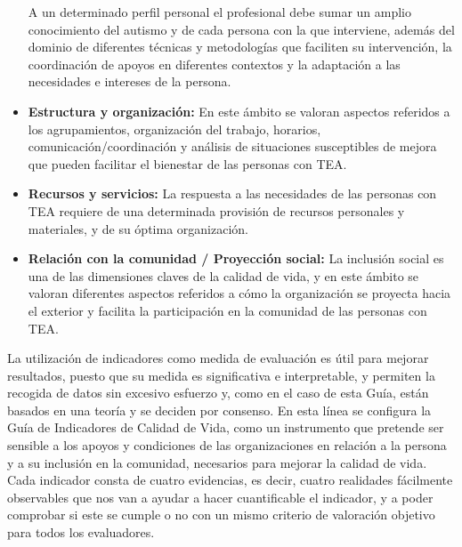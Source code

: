 \begin{itemize}
	A un determinado perfil personal el profesional debe sumar un amplio
	conocimiento del autismo y de cada persona con la que interviene,
	además del dominio de diferentes técnicas y metodologías que faciliten
	su intervención, la coordinación de apoyos en diferentes contextos y la
	adaptación a las necesidades e intereses de la persona.
	\item \textbf{Estructura y organización: }
	En este ámbito se valoran aspectos referidos a los agrupamientos,
	organización del trabajo, horarios, comunicación/coordinación y análisis
	de situaciones susceptibles de mejora que pueden facilitar el bienestar
	de las personas con TEA.
	\item \textbf{Recursos y servicios: }
	La respuesta a las necesidades de las personas con TEA requiere de
	una determinada provisión de recursos personales y materiales, y de su
	óptima organización.
	\item \textbf{Relación con la comunidad / Proyección social: }
	La inclusión social es una de las dimensiones claves de la calidad de
	vida, y en este ámbito se valoran diferentes aspectos referidos a cómo la
	organización se proyecta hacia el exterior y facilita la participación en la
	comunidad de las personas con TEA.
\end{itemize}

La utilización de indicadores como medida de evaluación es útil para mejorar resultados,
puesto que su medida es significativa e interpretable, y permiten la recogida de
datos sin excesivo esfuerzo y, como en el caso de esta Guía, están basados en
una teoría y se deciden por consenso.
En esta línea se configura la Guía de Indicadores de Calidad de Vida, como un
instrumento que pretende ser sensible a los apoyos y condiciones de las
organizaciones en relación a la persona y a su inclusión en la comunidad,
necesarios para mejorar la calidad de vida.
Cada indicador consta de cuatro evidencias, es decir, cuatro realidades
fácilmente observables que nos van a ayudar a hacer cuantificable el indicador,
y a poder comprobar si este se cumple o no con un mismo criterio de
valoración objetivo para todos los evaluadores.

